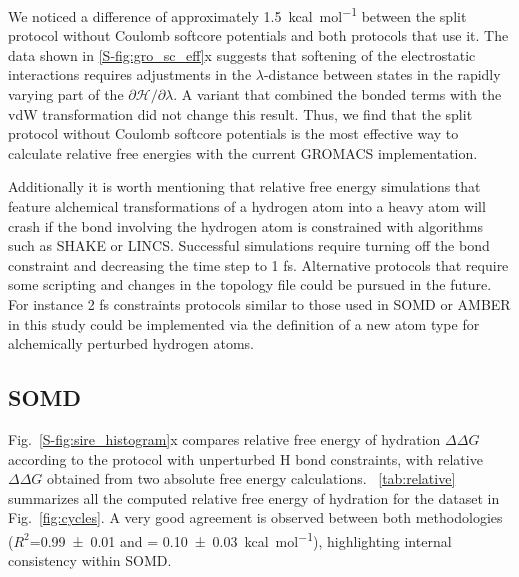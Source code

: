 \documentclass[journal=jctcce,manuscript=article]{achemso}
\providecommand{\DIFadd}[1]{\protect\cbstart{\protect\color{blue}\uwave{#1}}\protect\cbend} %
\providecommand{\DIFdel}[1]{\protect\cbdelete{\protect\color{red}\sout{#1}}\protect\cbdelete} %
\providecommand{\DIFaddbegin}{} %
\providecommand{\DIFaddend}{} %
\providecommand{\DIFdelbegin}{} %
\providecommand{\DIFdelend}{} %
\newcommand{\DIFscaledelfig}{0.5}
\newlength{\DIFdelgraphicswidth} %
\newlength{\DIFdelgraphicsheight} %
\newcommand{\DIFaddincludegraphics}[2][]{{\color{blue}\fbox{\DIFOincludegraphics[#1]{#2}}}} %
\newcommand{\DIFdelincludegraphics}[2][]{%
\sbox{\DIFdelgraphicsbox}{\DIFOincludegraphics[#1]{#2}}%
\settoboxwidth{\DIFdelgraphicswidth}{\DIFdelgraphicsbox} %
\settoboxtotalheight{\DIFdelgraphicsheight}{\DIFdelgraphicsbox} %
\scalebox{\DIFscaledelfig}{%
\parbox[b]{\DIFdelgraphicswidth}{\usebox{\DIFdelgraphicsbox}\\[-\baselineskip] \rule{\DIFdelgraphicswidth}{0em}}\llap{\resizebox{\DIFdelgraphicswidth}{\DIFdelgraphicsheight}{%
\setlength{\unitlength}{\DIFdelgraphicswidth}%
\begin{picture}(1,1)%
\thicklines\linethickness{2pt} %
{\color[rgb]{1,0,0}\put(0,0){\framebox(1,1){}}}%
{\color[rgb]{1,0,0}\put(0,0){\line( 1,1){1}}}%
{\color[rgb]{1,0,0}\put(0,1){\line(1,-1){1}}}%
\end{picture}%
}\hspace*{3pt}}} %
} %
\DeclareRobustCommand{\DIFaddbegin}{\DIFOaddbegin \let\includegraphics\DIFaddincludegraphics} %
\DeclareRobustCommand{\DIFaddend}{\DIFOaddend \let\includegraphics\DIFOincludegraphics} %
\DeclareRobustCommand{\DIFdelbegin}{\DIFOdelbegin \let\includegraphics\DIFdelincludegraphics} %
\DeclareRobustCommand{\DIFdelend}{\DIFOaddend \let\includegraphics\DIFOincludegraphics} %
\begin{document}
We noticed a difference of approximately \SI{1.5}{kcal.mol^{-1}} between the
split protocol without Coulomb softcore potentials and both protocols that
use it.  The data shown in \DIFdelbegin \DIFdel{Figure }\DIFdelend \DIFaddbegin \DIFadd{Fig. }\DIFaddend \ref{S-fig:gro_sc_eff}x suggests that
softening of the electrostatic interactions requires adjustments in
the $\lambda$-distance between states in the rapidly varying part of
the $\partial \mathcal{H}/\partial\lambda$.  A variant that combined
the bonded terms with the vdW transformation did not change this
result.  Thus, we find that the split protocol without Coulomb
softcore potentials is the most effective way to calculate relative
free energies with the current GROMACS implementation.

Additionally it is worth mentioning \DIFdelbegin \DIFdel{is }\DIFdelend that relative free energy
simulations that feature alchemical transformations of a hydrogen atom
into a heavy atom will crash if the bond involving the hydrogen atom
is constrained with algorithms such as SHAKE or LINCS.  Successful
simulations require turning off the bond constraint and decreasing the
time step to 1 fs. Alternative protocols that require some scripting
and changes in the topology file could be pursued in the future. For
instance 2 fs constraints protocols similar to those used in SOMD or
AMBER in this study could be implemented via the definition of a new
atom type for alchemically perturbed hydrogen atoms.


\subsection{SOMD}
\label{sec:somd-results}

Fig.~\ref{S-fig:sire_histogram}x compares relative free energy of hydration
$\Delta\Delta G$ according to the protocol with unperturbed H bond constraints, with relative
$\Delta \Delta G$ obtained from two absolute free energy calculations.
\DIFdelbegin \DIFdel{Table}\DIFdelend \DIFaddbegin \DIFadd{Tab.}\DIFaddend ~\ref{tab:relative} summarizes all the computed relative free energy of
hydration for the dataset in Fig.~\ref{fig:cycles}.
A very good agreement is observed between both methodologies
($R^2$=\SI{0.99+-0.01}{} and \DIFdelbegin \DIFdel{MAD }\DIFdelend \DIFaddbegin \DIFadd{MAE }\DIFaddend = \SI{0.10+-0.03}{kcal.mol^{-1}}),
highlighting internal consistency within SOMD.
\end{document}
